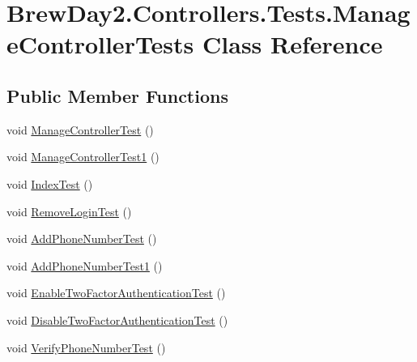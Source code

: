 \hypertarget{class_brew_day2_1_1_controllers_1_1_tests_1_1_manage_controller_tests}{}\section{Brew\+Day2.\+Controllers.\+Tests.\+Manage\+Controller\+Tests Class Reference}
\label{class_brew_day2_1_1_controllers_1_1_tests_1_1_manage_controller_tests}
\subsection*{Public Member Functions}
\begin{DoxyCompactItemize}
\item 
void \mbox{\hyperlink{class_brew_day2_1_1_controllers_1_1_tests_1_1_manage_controller_tests_a64b8ad1e155de5eca360bf36261b4aa9}{Manage\+Controller\+Test}} ()
\item 
void \mbox{\hyperlink{class_brew_day2_1_1_controllers_1_1_tests_1_1_manage_controller_tests_ac2436b6a20423b632d7d62b6576bbccf}{Manage\+Controller\+Test1}} ()
\item 
void \mbox{\hyperlink{class_brew_day2_1_1_controllers_1_1_tests_1_1_manage_controller_tests_a3d3cc0908a5d2520ac521ce6e4fecb2b}{Index\+Test}} ()
\item 
void \mbox{\hyperlink{class_brew_day2_1_1_controllers_1_1_tests_1_1_manage_controller_tests_a027c38206995774196d5d343d78d8cef}{Remove\+Login\+Test}} ()
\item 
void \mbox{\hyperlink{class_brew_day2_1_1_controllers_1_1_tests_1_1_manage_controller_tests_a23dcf53861be7ab6fc7bba3e8f299862}{Add\+Phone\+Number\+Test}} ()
\item 
void \mbox{\hyperlink{class_brew_day2_1_1_controllers_1_1_tests_1_1_manage_controller_tests_aa6d5f4905a8cc4a4d4ec98bd3d04f6c1}{Add\+Phone\+Number\+Test1}} ()
\item 
void \mbox{\hyperlink{class_brew_day2_1_1_controllers_1_1_tests_1_1_manage_controller_tests_aab3c467cf6e82ad2e14fb6e60e8fe583}{Enable\+Two\+Factor\+Authentication\+Test}} ()
\item 
void \mbox{\hyperlink{class_brew_day2_1_1_controllers_1_1_tests_1_1_manage_controller_tests_a9342fcf751d897f28a0278d4a76d9a02}{Disable\+Two\+Factor\+Authentication\+Test}} ()
\item 
void \mbox{\hyperlink{class_brew_day2_1_1_controllers_1_1_tests_1_1_manage_controller_tests_aff1039c9c39e628a2d955cf7b75970cc}{Verify\+Phone\+Number\+Test}} ()

\end{DoxyCompactItemize}
